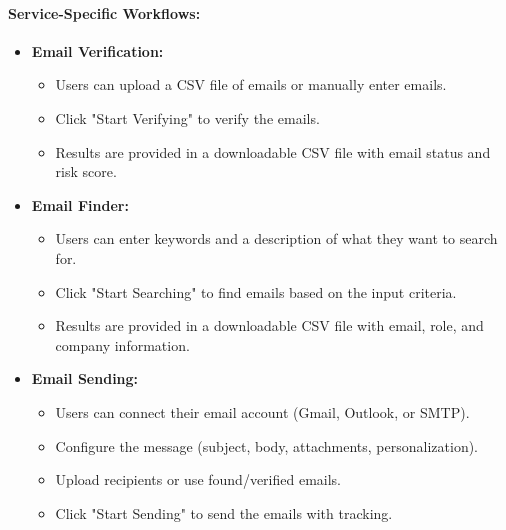\documentclass{article}
\begin{document}
\paragraph{Service-Specific Workflows:}
\begin{itemize}
    \item \textbf{Email Verification:}
    \begin{itemize}
        \item Users can upload a CSV file of emails or manually enter emails.
        \item Click "Start Verifying" to verify the emails.
        \item Results are provided in a downloadable CSV file with email status and risk score.
    \end{itemize}
    \item \textbf{Email Finder:}
    \begin{itemize}
        \item Users can enter keywords and a description of what they want to search for.
        \item Click "Start Searching" to find emails based on the input criteria.
        \item Results are provided in a downloadable CSV file with email, role, and company information.
    \end{itemize}
    \item \textbf{Email Sending:}
    \begin{itemize}
        \item Users can connect their email account (Gmail, Outlook, or SMTP).
        \item Configure the message (subject, body, attachments, personalization).
        \item Upload recipients or use found/verified emails.
        \item Click "Start Sending" to send the emails with tracking.
    \end{itemize}
\end{itemize}
\end{document}
